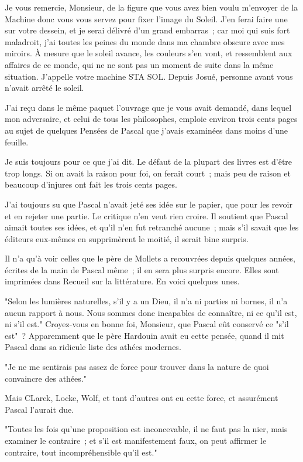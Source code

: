 \documentclass[french,twoside]{book} %
\begin{document}
\noindent Je vous remercie, Monsieur, de la figure que vous avez bien voulu m’envoyer de la Machine donc vous vous servez pour fixer l’image du Soleil. J’en ferai faire une sur votre dessein, et je serai délivré d’un grand embarras ; car moi qui suis fort maladroit, j’ai toutes les peines du monde dans ma chambre obscure avec mes miroirs. À mesure que le soleil avance, les couleurs s’en vont, et ressemblent aux affaires de ce monde, qui ne ne sont pas un moment de suite dans la même situation. J’appelle votre machine STA SOL. Depuis Josué, personne avant vous n’avait arrêté le soleil.\par
J’ai reçu dans le même paquet l’ouvrage que je vous avait demandé, dans lequel mon adversaire, et celui de tous les philosophes, emploie environ trois cents pages au sujet de quelques Pensées de Pascal que j’avais examinées dans moins d’une feuille.\par
Je suis toujours pour ce que j’ai dit. Le défaut de la plupart des livres est d’être trop longs. Si on avait la raison pour foi, on ferait court ; mais peu de raison et beaucoup d’injures ont fait les trois cents pages.\par
J’ai toujours su que Pascal n’avait jeté ses idée sur le papier, que pour les revoir et en rejeter une partie. Le critique n’en veut rien croire. Il soutient que Pascal aimait toutes ses idées, et qu’il n’en fut retranché aucune ; mais s’il savait que les éditeurs eux-mêmes en supprimèrent le moitié, il serait bine surpris.\par
Il n’a qu’à voir celles que le père de Mollets a recouvrées depuis quelques années, écrites de la main de Pascal même ; il en sera plus surpris encore. Elles sont imprimées dans Recueil sur la littérature. En voici quelques unes.\par
 "Selon les lumières naturelles, s’il y a un Dieu, il n’a ni parties ni bornes, il n’a aucun rapport à nous. Nous sommes donc incapables de connaître, ni ce qu’il est, ni s’il est." Croyez-vous en bonne foi, Monsieur, que Pascal eût conservé ce "s’il est" ? Apparemment que le père Hardouin avait eu cette pensée, quand il mit Pascal dans sa ridicule liste des athées modernes.\par
"Je ne me sentirais pas assez de force pour trouver dans la nature de quoi convaincre des athées."\par
Mais CLarck, Locke, Wolf, et tant d’autres ont eu cette force, et assurément Pascal l’aurait due. \par
"Toutes les fois qu’une proposition est inconcevable, il ne faut pas la nier, mais examiner le contraire ; et s’il est manifestement faux, on peut affirmer le contraire, tout incompréhensible qu’il est."\par
\end{document}
